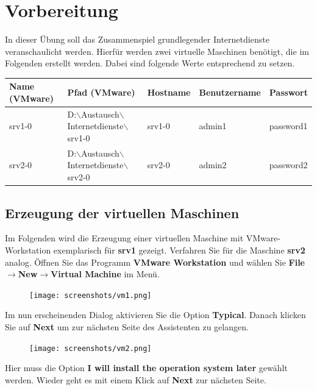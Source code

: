 
\section{Vorbereitung}
In dieser Übung soll das Zusammenspiel grundlegender Internetdienste veranschaulicht werden.
Hierfür werden zwei virtuelle Maschinen benötigt, die im Folgenden erstellt werden. Dabei sind folgende
Werte entsprechend zu setzen.

\scriptsize\begin{tabular}[t]{l l l l l}
\hline
Name (VMware) & Pfad (VMware) & Hostname & Benutzername & Passwort \\
\hline
srv1-0 & D:$\backslash$Austausch$\backslash$Internetdienste$\backslash$srv1-0 &
srv1-0 & admin1 & password1 \\
srv2-0 & D:$\backslash$Austausch$\backslash$Internetdienste$\backslash$srv2-0 &
srv2-0 & admin2 & password2 \\
\hline
\end{tabular}

\normalsize \subsection{Erzeugung der virtuellen Maschinen}
Im Folgenden wird die Erzeugung einer virtuellen Maschine mit VMware-Workstation exemplarisch für \textbf{srv1} gezeigt. Verfahren Sie für die Maschine \textbf{srv2} analog.
Öffnen Sie das Programm  \textbf{VMware Workstation} und wählen Sie \textbf{File$\rightarrow$New$\rightarrow$Virtual Machine} im Menü.

\begin{figure}[H]
\begin{center}
\texttt{[image: screenshots/vm1.png]}
\end{center}
\end{figure}

\pagebreak
Im nun erscheinenden Dialog aktivieren Sie die Option \textbf{Typical}. Danach klicken Sie auf \textbf{Next} um zur nächsten Seite des Assistenten
zu gelangen.

\begin{figure}[H]
\begin{center}
\texttt{[image: screenshots/vm2.png]}
\end{center}
\end{figure}

Hier muss die Option \textbf{I will install the operation system later} gewählt werden. Wieder geht es mit einem
Klick auf \textbf{Next} zur nächsten Seite.


